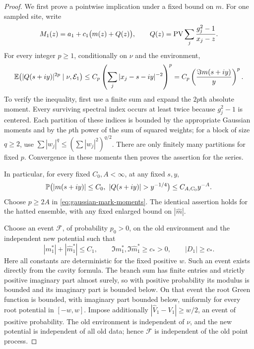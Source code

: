 \begin{proof}
We first prove a pointwise implication under a fixed bound on $m$.
For one sampled site, write
\[
 M_1(z)=a_1+c_1\bigl(m(z)+Q(z)\bigr),\qquad
 Q(z)=\operatorname{PV}\sum_j\frac{g_j^2-1}{x_j-z}.
\]
For every integer $p\ge1$, conditionally on $\nu$ and the environment,
\begin{equation}\label{eq:gaussian-mark-moments}
 \mathbb E\bigl(|Q(s+iy)|^{2p}\mid\nu,\mathcal E_1\bigr)
  \le C_p\left(\sum_j|x_j-s-iy|^{-2}\right)^p
  =C_p\left(\frac{\Im m(s+iy)}y\right)^p.
\end{equation}
To verify the inequality, first use a finite sum and expand the
$2p$th absolute moment. Every surviving spectral index occurs at
least twice because $g_j^2-1$ is centered. Each partition of these
indices is bounded by the appropriate Gaussian moments and by the
$p$th power of the sum of squared weights; for a block of size
$q\ge2$, use $\sum |w_j|^q\le(\sum|w_j|^2)^{q/2}$. There are only
finitely many partitions for fixed $p$. Convergence in these moments
then proves the assertion for the series.

In particular, for every fixed $C_0,A<\infty$, at any fixed $s,y$,
\begin{equation}\label{eq:marked-concentration-implication}
 \PP\bigl(|m(s+iy)|\le C_0,\ |Q(s+iy)|>y^{-1/4}\bigr)
                              \le C_{A,C_0}y^{-A}.
\end{equation}
Choose $p\ge2A$ in \eqref{eq:gaussian-mark-moments}. The identical
assertion holds for the hatted ensemble, with any fixed enlarged
bound on $|\widehat m|$.

Choose an event $\mathcal F$, of probability $p_0>0$, on the old
environment and the independent new potential such that
\begin{equation}\label{eq:resampling-environment-event}
 |m_1^*|+|\widehat m_1^*|\le C_1,\qquad
 \Im m_1^*,\Im\widehat m_1^*\ge c_*>0,\qquad |D_1|\ge c_*.
\end{equation}
Here all constants are deterministic for the fixed positive $w$.
Such an event exists directly from the cavity formula. The branch
sum has finite entries and strictly positive imaginary part almost
surely, so with positive probability its modulus is bounded and its
imaginary part is bounded below. On that event the root Green
function is bounded, with imaginary part bounded below, uniformly
for every root potential in $[-w,w]$. Impose additionally
$|\widehat V_1-V_1|\ge w/2$, an event of positive probability.
The old environment is independent of $\nu$, and the new potential
is independent of all old data; hence $\mathcal F$ is independent
of the old point process.


\end{proof}
